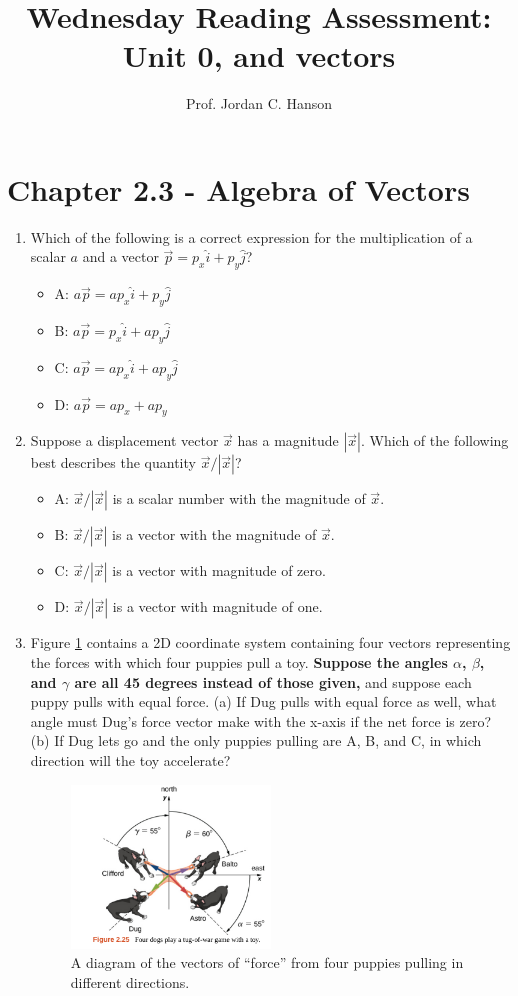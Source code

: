 \documentclass{article}
\begin{document}
\title{Wednesday Reading Assessment: Unit 0, and vectors}
\author{Prof. Jordan C. Hanson}

\maketitle

\section{Chapter 2.3 - Algebra of Vectors}

\begin{enumerate}
\item Which of the following is a correct expression for the multiplication of a scalar $a$ and a vector $\vec{p} = p_x \hat{i} + p_y \hat{j}$?
\begin{itemize}
\item A: $a\vec{p} = a p_x \hat{i} + p_y \hat{j}$
\item B: $a\vec{p} = p_x \hat{i} + a p_y \hat{j}$
\item C: $a\vec{p} = a p_x \hat{i} + a p_y \hat{j}$
\item D: $a\vec{p} = a p_x + a p_y$
\end{itemize}
\item Suppose a displacement vector $\vec{x}$ has a magnitude $|\vec{x}|$.  Which of the following best describes the quantity $\vec{x}/|\vec{x}|$?
\begin{itemize}
\item A: $\vec{x}/|\vec{x}|$ is a scalar number with the magnitude of $\vec{x}$.
\item B: $\vec{x}/|\vec{x}|$ is a vector with the magnitude of $\vec{x}$.
\item C: $\vec{x}/|\vec{x}|$ is a vector with magnitude of zero.
\item D: $\vec{x}/|\vec{x}|$ is a vector with magnitude of one.
\end{itemize}
\item Figure \ref{fig:puppies} contains a 2D coordinate system containing four vectors representing the forces with which four puppies pull a toy.  \textbf{Suppose the angles $\alpha$, $\beta$, and $\gamma$ are all 45 degrees instead of those given,} and suppose each puppy pulls with equal force.  (a) If Dug pulls with equal force as well, what angle must Dug's force vector make with the x-axis if the net force is zero?  (b) If Dug lets go and the only puppies pulling are A, B, and C, in which direction will the toy accelerate?
\begin{figure}[hb]
\center
\includegraphics[width=0.5\textwidth]{figures/puppies.png}
\caption{\label{fig:puppies} A diagram of the vectors of ``force'' from four puppies pulling in different directions.}
\end{figure}
\end{enumerate}
\end{document}

